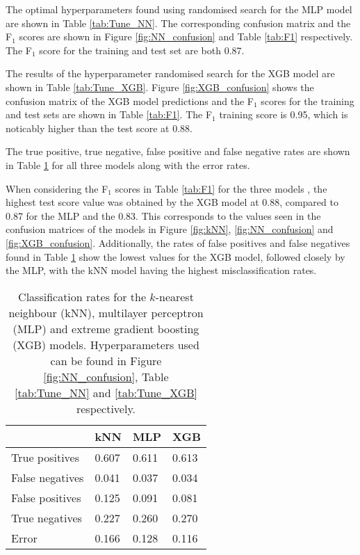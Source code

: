 \documentclass[a4paper, 11pt, twocolumn]{article}
\begin{document}
The optimal hyperparameters found using randomised search for the MLP model are 
shown in Table \ref{tab:Tune_NN}. The corresponding confusion matrix and the 
F$_1$ scores are shown in Figure \ref{fig:NN_confusion} and Table \ref{tab:F1} 
respectively. The F$_1$ score for the training and test set are both 0.87. 

The results of the hyperparameter randomised search for the XGB model are shown 
in Table \ref{tab:Tune_XGB}. Figure \ref{fig:XGB_confusion} shows the confusion 
matrix of the XGB model predictions and the F$_1$ scores for the training and 
test sets are shown in Table \ref{tab:F1}. The F$_1$ training score is 0.95, 
which is noticably higher than the test score at 0.88. 

The true positive, true negative, false positive and false negative rates are 
shown in Table \ref{tab:classification_rates} for all three models along with 
the error rates. 

When considering the F$_1$ scores in Table \ref{tab:F1} for the three models , 
the highest test score value was obtained by the XGB model at 0.88, compared to 
0.87 for the MLP and the 0.83. This corresponds to the values seen in the 
confusion matrices of the models in Figure \ref{fig:kNN}, \ref{fig:NN_confusion} 
and \ref{fig:XGB_confusion}. Additionally, the rates of false positives and 
false negatives found in Table \ref{tab:classification_rates} show the lowest 
values for the XGB model, followed closely by the MLP, with the kNN model having 
the highest misclassification rates. 

\begin{table}
\caption{Classification rates for the $k$-nearest neighbour (kNN), multilayer 
perceptron (MLP) and extreme gradient boosting (XGB) models. Hyperparameters used 
can be found in Figure \ref{fig:NN_confusion}, Table 
\ref{tab:Tune_NN} and \ref{tab:Tune_XGB} respectively.}
\label{tab:classification_rates}
  \begin{tabular}{|l|l|l|l|} \hline 
      & \textbf{kNN } \hspace*{2pt}& \textbf{MLP} \hspace*{2pt}& \textbf{XGB} \hspace*{2pt}\\ \hline 
      {True positives}  & 0.607 & 0.611 & 0.613 \\ \hline
      {False negatives} & 0.041 & 0.037 & 0.034 \\ \hline 
      {False positives} & 0.125 & 0.091 & 0.081 \\ \hline 
      {True negatives}  & 0.227 & 0.260 & 0.270 \\ \hline  
      Error             & 0.166 & 0.128 & 0.116 \\ \hline
  \end{tabular}
\end{table}
\end{document}
